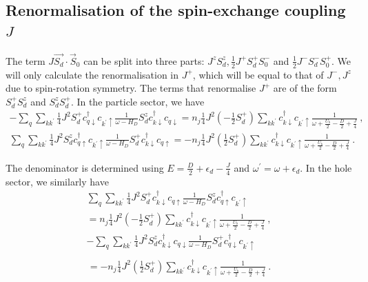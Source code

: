 \documentclass[reprint,superscriptaddress,floatfix]{revtex4-2}
\begin{document}
\begin{widetext}
\subsection{Renormalisation of the spin-exchange coupling \(J\)}
The term \(J \vec{S_d}\cdot\vec{S}_0\) can be split into three parts: \(J^z S_d^z, \frac{1}{2}J^+ S_d^+ S_0^-\) and \(\frac{1}{2}J^- S_d^- S_0^+\). We will only calculate the renormalisation in \(J^+\), which will be equal to that of \(J^-,J^z\) due to spin-rotation symmetry. The terms that renormalise \(J^+\) are of the form \(S_d^+ S_d^z\) and \(S_d^z S_d^+\). In the particle sector, we have
\begin{equation}\begin{aligned}
	-\sum_{q} \sum_{kk^\prime}\frac{1}{4}J^2 S_d^+ c^\dagger_{q\downarrow}c_{k^\prime \uparrow} \frac{1}{\omega - H_D}S_d^z c^\dagger_{k \downarrow}c_{q \downarrow} = n_j \frac{1}{4}J^2 \left(-\frac{1}{2}S_d^+\right) \sum_{kk^\prime}c^\dagger_{k \downarrow}c_{k^\prime \uparrow} \frac{1}{\omega + \frac{U_b}{2} - \frac{D}{2} + \frac{J}{4}}~,\\
	\sum_{q} \sum_{kk^\prime} \frac{1}{4}J^2 S_d^z c^\dagger_{q \uparrow}c_{k^\prime \uparrow} \frac{1}{\omega - H_D} S_d^+ c^\dagger_{k\downarrow}c_{q \uparrow} = -n_j \frac{1}{4}J^2 \left(\frac{1}{2}S_d^+\right) \sum_{kk^\prime}c^\dagger_{k \downarrow}c_{k^\prime \uparrow} \frac{1}{\omega + \frac{U_b}{2} - \frac{D}{2} + \frac{J}{4}}~.
\end{aligned}\end{equation}
\end{widetext}
The denominator is determined using \(E = \frac{D}{2} + \epsilon_d - \frac{J}{4}\) and \(\omega^\prime = \omega + \epsilon_d\).
In the hole sector, we similarly have
\begin{equation}\begin{aligned}
	\sum_{q} \sum_{kk^\prime}\frac{1}{4}J^2 S_d^+ c^\dagger_{k\downarrow}c_{q \uparrow} \frac{1}{\omega - H_D}S_d^z c^\dagger_{q \uparrow}c_{k^\prime \uparrow}\\
	= n_j \frac{1}{4}J^2 \left(-\frac{1}{2}S_d^+\right) \sum_{kk^\prime}c^\dagger_{k \downarrow}c_{k^\prime \uparrow} \frac{1}{\omega + \frac{U_b}{2} - \frac{D}{2} + \frac{J}{4}}~,\\
	-\sum_{q} \sum_{kk^\prime} \frac{1}{4}J^2 S_d^z c^\dagger_{k \downarrow}c_{q \downarrow} \frac{1}{\omega - H_D} S_d^+ c^\dagger_{q\downarrow}c_{k^\prime \uparrow} \\
\end{aligned}\end{equation}
\begin{equation}\begin{aligned}
	= -n_j \frac{1}{4}J^2 \left(\frac{1}{2}S_d^+\right) \sum_{kk^\prime}c^\dagger_{k \downarrow}c_{k^\prime \uparrow} \frac{1}{\omega + \frac{U_b}{2} - \frac{D}{2} + \frac{J}{4}}~.
\end{aligned}\end{equation}
\end{document}
